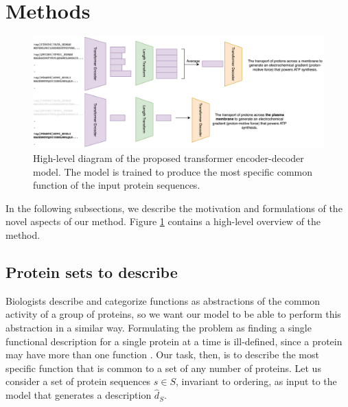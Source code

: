 \documentclass{article}
\begin{document}
\section{Methods}
\begin{figure}
    \centering
    \includegraphics[width=0.9\linewidth]{prot2go.png}
    \caption{High-level diagram of the proposed transformer encoder-decoder model.
The model is trained to produce the most specific common function of the input protein sequences.}
    \label{overview}
\end{figure}
In the following subsections, we describe the motivation and formulations of the novel aspects of our method. Figure \ref{overview} contains a high-level overview of the method.

    
    \subsection{Protein sets to describe}
    Biologists describe and categorize functions as abstractions of the common activity of a group of proteins, so we want our model to be able to perform this abstraction in a similar way.
    Formulating the problem as finding a single functional description for a single protein at a time is ill-defined, since a protein may have more than one function \cite{jeffery2018protein}.
    Our task, then, is to describe the most specific function that is common to a set of any number of proteins. 
    Let us consider a set of protein sequences $s \in S$, invariant to ordering, as input to the model that generates a description $\hat{d}_{S}$.
\end{document}
